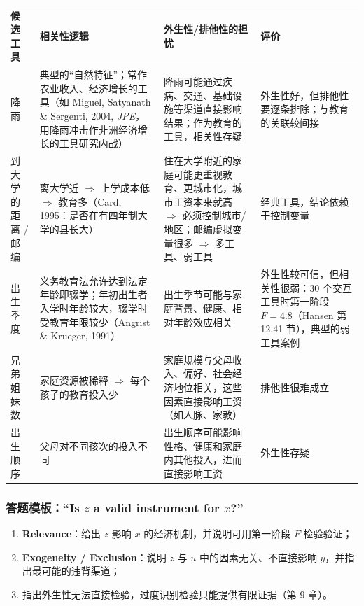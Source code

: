 \begin{center}
\small
\begin{tabularx}{\linewidth}{>{\raggedright\arraybackslash}p{1.7cm}LL>{\raggedright\arraybackslash}p{3.2cm}}
\toprule
候选工具 & 相关性逻辑 & 外生性/排他性的担忧 & 评价\\
\midrule
降雨 & 典型的“自然特征”；常作农业收入、经济增长的工具（如 Miguel, Satyanath \& Sergenti, 2004, \emph{JPE}，用降雨冲击作非洲经济增长的工具研究内战） & 降雨可能通过疾病、交通、基础设施等渠道直接影响结果；作为教育的工具，相关性存疑 & 外生性好，但排他性要逐条排除；与教育的关联较间接\\
\addlinespace
到大学的距离 / 邮编 & 离大学近 $\Rightarrow$ 上学成本低 $\Rightarrow$ 教育多（Card, 1995：是否在有四年制大学的县长大） & 住在大学附近的家庭可能更重视教育、更城市化，城市工资本来就高 $\Rightarrow$ 必须控制城市/地区；邮编虚拟变量很多 $\Rightarrow$ 多工具、弱工具 & 经典工具，结论依赖于控制变量\\
\addlinespace
出生季度 & 义务教育法允许达到法定年龄即辍学；年初出生者入学时年龄较大，辍学时受教育年限较少（Angrist \& Krueger, 1991） & 出生季节可能与家庭背景、健康、相对年龄效应相关 & 外生性较可信，但相关性很弱：30 个交互工具时第一阶段 $F=4.8$（Hansen 第 12.41 节），典型的弱工具案例\\
\addlinespace
兄弟姐妹数 & 家庭资源被稀释 $\Rightarrow$ 每个孩子的教育投入少 & 家庭规模与父母收入、偏好、社会经济地位相关，这些因素直接影响工资（如人脉、家教） & 排他性很难成立\\
\addlinespace
出生顺序 & 父母对不同孩次的投入不同 & 出生顺序可能影响性格、健康和家庭内其他投入，进而直接影响工资 & 外生性存疑\\
\bottomrule
\end{tabularx}
\end{center}

\subsubsection{答题模板：“Is \texorpdfstring{$z$}{z} a valid instrument for \texorpdfstring{$x$}{x}?”}

\begin{keypt}
\begin{enumerate}
  \item \textbf{Relevance}：给出 $z$ 影响 $x$ 的经济机制，并说明可用第一阶段 $F$ 检验验证；
  \item \textbf{Exogeneity / Exclusion}：说明 $z$ 与 $u$ 中的因素无关、不直接影响 $y$，并指出最可能的违背渠道；
  \item 指出外生性无法直接检验，过度识别检验只能提供有限证据（第 9 章）。
\end{enumerate}
\end{keypt}

